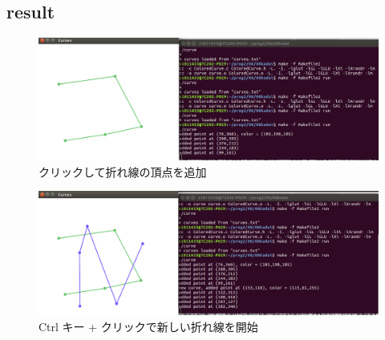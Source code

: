 \documentclass[10pt,a4paper]{jsarticle}
\begin{document}





\subsection{result}

\begin{figure}[h!]
  \includegraphics[width=0.8\linewidth]{01.png}
  \caption{クリックして折れ線の頂点を追加}
  \label{fig:sutehage}
\end{figure}

\begin{figure}[h!]
  \includegraphics[width=0.8\linewidth]{02.png}
  \caption{Ctrl キー + クリックで新しい折れ線を開始}
  \label{fig:sutehage}
\end{figure}
\end{document}
